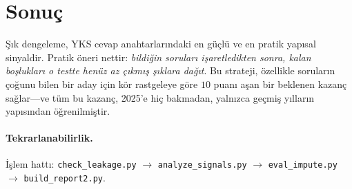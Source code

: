 \documentclass[11pt]{article}
\begin{document}
\section{Sonuç}
Şık dengeleme, YKS cevap anahtarlarındaki en güçlü ve en pratik yapısal
sinyaldir. Pratik öneri nettir: \emph{bildiğin soruları işaretledikten
sonra, kalan boşlukları o testte henüz az çıkmış şıklara dağıt}. Bu strateji,
özellikle soruların çoğunu bilen bir aday için kör rastgeleye göre $10$
puanı aşan bir beklenen kazanç sağlar---ve tüm bu kazanç, 2025'e hiç
bakmadan, yalnızca geçmiş yılların yapısından öğrenilmiştir.

\paragraph{Tekrarlanabilirlik.} İşlem hattı: \texttt{check\_leakage.py}
$\rightarrow$ \texttt{analyze\_signals.py} $\rightarrow$
\texttt{eval\_impute.py} $\rightarrow$ \texttt{build\_report2.py}.
\end{document}
